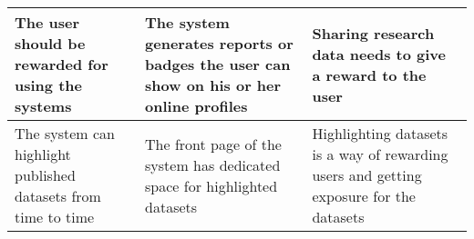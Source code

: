 \begin{tabularx}{\textwidth}{| >{\raggedright}p{3cm} | >{\raggedright}p{3cm} | X |}
    \hline
    The user should be rewarded for using the systems &The system generates reports or badges the user can show on his or her online profiles& Sharing research data needs to give a reward to the user\\
    \hline
    \rowcolor{Gray}
    The system can highlight published datasets from time to time&The front page of the system has dedicated space for highlighted datasets&Highlighting datasets is a way of rewarding users and getting exposure for the datasets\\
    \hline
\end{tabularx}

\normalsize
